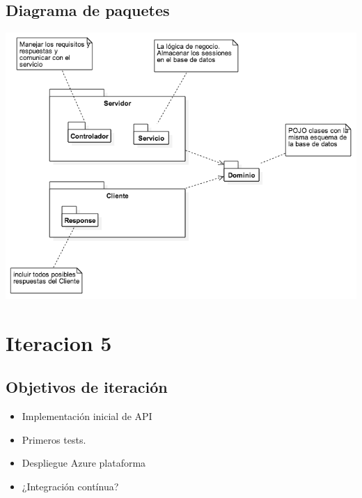 \documentclass[12pt,a4paper]{report}
\begin{document}
\section{Diagrama de paquetes}
\begin{center}
 \includegraphics[scale=0.6]{diagrams/package_diagram.png}
\end{center}

\chapter{Iteracion 5}
\section{Objetivos de iteración}
\begin{itemize}
  \item Implementación inicial de API
  \item Primeros tests.
  \item Despliegue Azure plataforma
  \item ¿Integración contínua?
\end{itemize}
\end{document}
